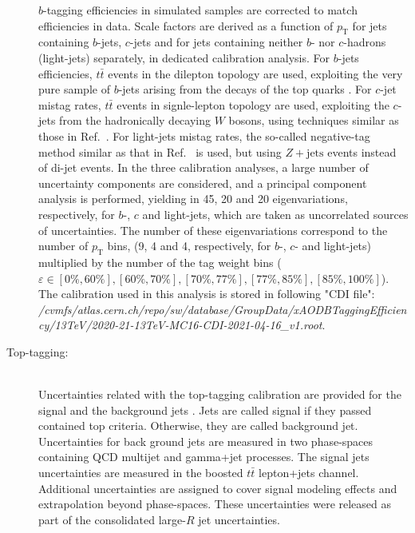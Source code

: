 \begin{description}
    $b$-tagging efficiencies in simulated samples are corrected to match efficiencies in data. Scale factors are derived as a function of $p_\text{T}$ for jets containing $b$-jets, $c$-jets and for jets containing neither $b$- nor $c$-hadrons (light-jets) separately, in dedicated calibration analysis. For $b$-jets efficiencies, $t\bar{t}$ events in the dilepton topology are used, exploiting the very pure sample of $b$-jets arising from the decays of the top quarks \cite{FTAG-2018-01}. For $c$-jet mistag rates, $t\bar{t}$ events in signle-lepton topology are used, exploiting the $c$-jets from the hadronically decaying $W$ bosons, using techniques similar as those in Ref.~\cite{ATLAS-CONF-2018-001}. For light-jets mistag rates, the so-called negative-tag method similar as that in Ref.~\cite{ATLAS-CONF-2018-006} is used, but using $Z+\text{jets}$ events instead of di-jet events. In the three calibration analyses, a large number of uncertainty components are considered, and a principal component analysis is performed, yielding in 45, 20 and 20 eigenvariations, respectively, for $b$-, $c$ and light-jets, which are taken as uncorrelated sources of uncertainties. The number of these eigenvariations correspond to the number of $p_\text{T}$ bins, (9, 4 and 4, respectively, for $b$-, $c$- and light-jets) multiplied by the number of the tag weight bins (${\varepsilon}{\in}[0\%,60\%],[60\%,70\%],[70\%,77\%],[77\%,85\%],[85\%,100\%]$). The calibration used in this analysis is stored in following "CDI file":\\
    \textit{/cvmfs/atlas.cern.ch/repo/sw/database/GroupData/xAODBTaggingEfficiency/13TeV/2020-21-13TeV-MC16-CDI-2021-04-16\_v1.root}.
  \item[Top-tagging:] \mbox{}\\
    Uncertainties related with the top-tagging calibration are provided for the signal and the background jets \cite{JETM-2018-03, ATL-PHYS-PUB-2020-017}. Jets are called signal if they passed contained top criteria. Otherwise, they are called background jet. Uncertainties for back ground jets are measured in two phase-spaces containing QCD multijet and gamma+jet processes. The signal jets uncertainties are measured in the boosted $t\bar{t}$ lepton+jets channel. Additional uncertainties are assigned to cover signal modeling effects and extrapolation beyond phase-spaces. These uncertainties were released as part of the consolidated large-$R$ jet uncertainties.

\end{description}
